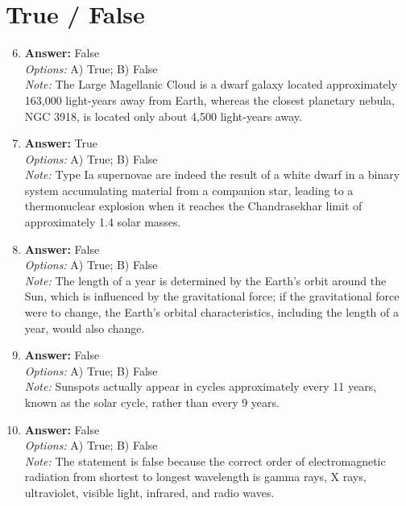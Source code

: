 \documentclass[12pt]{article}
\begin{document}
\section*{True / False}
\begin{enumerate}[label=\arabic*.]
\setcounter{enumi}{5}
\item \textbf{Answer:} False
\\ \textit{Options:} A) True; B) False
\\ \textit{Note:} The Large Magellanic Cloud is a dwarf galaxy located approximately 163,000 light-years away from Earth, whereas the closest planetary nebula, NGC 3918, is located only about 4,500 light-years away.
\item \textbf{Answer:} True
\\ \textit{Options:} A) True; B) False
\\ \textit{Note:} Type Ia supernovae are indeed the result of a white dwarf in a binary system accumulating material from a companion star, leading to a thermonuclear explosion when it reaches the Chandrasekhar limit of approximately 1.4 solar masses.
\item \textbf{Answer:} False
\\ \textit{Options:} A) True; B) False
\\ \textit{Note:} The length of a year is determined by the Earth's orbit around the Sun, which is influenced by the gravitational force; if the gravitational force were to change, the Earth's orbital characteristics, including the length of a year, would also change.
\item \textbf{Answer:} False
\\ \textit{Options:} A) True; B) False
\\ \textit{Note:} Sunspots actually appear in cycles approximately every 11 years, known as the solar cycle, rather than every 9 years.
\item \textbf{Answer:} False
\\ \textit{Options:} A) True; B) False
\\ \textit{Note:} The statement is false because the correct order of electromagnetic radiation from shortest to longest wavelength is gamma rays, X rays, ultraviolet, visible light, infrared, and radio waves.
\end{enumerate}
\end{document}
